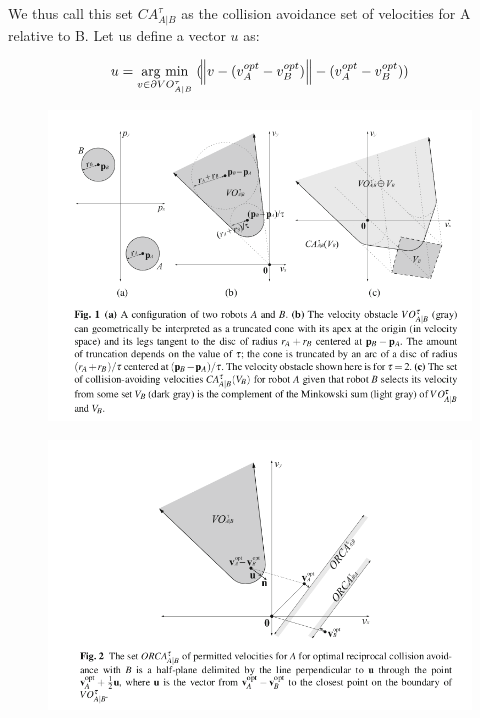 \documentclass[12pt]{report}
\newcommand{\argmin}[1]{\underset{#1}{\operatorname{arg}\,\operatorname{min}}\;}
\begin{document}
We thus call this set $CA^{\tau}_{A|B}$ as the collision avoidance set of velocities for A relative to B. Let us define a vector $u$ as:

\begin{eqnarray}
u = \argmin{v \in \partial VO^{\tau}_{A|B}}(\norm {v-(v_{A}^{opt}-v_{B}^{opt})} - (v_{A}^{opt}-v_{B}^{opt}))\label{eq:dir}
\end{eqnarray}

\begin{figure}[h]
	\centering
	\includegraphics[scale=0.6]{VO.png}  \label{fig:VO}
\end{figure}

\begin{figure}[h]
	\centering
	\includegraphics[scale=0.6]{ORCA.png}  \label{fig:ORCA}
\end{figure}
\end{document}
